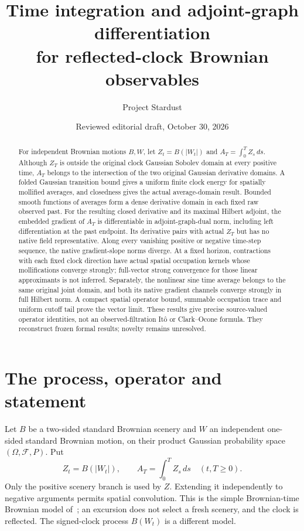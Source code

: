 \documentclass[11pt]{article}
\title{Time integration and adjoint-graph differentiation\\for reflected-clock Brownian observables}
\author{Project Stardust}
\date{Reviewed editorial draft, October 30, 2026}
\begin{document}
\maketitle
\begin{abstract}
For independent Brownian motions $B,W$, let $Z_t=B(|W_t|)$ and
$A_T=\int_0^T Z_s\,ds$. Although $Z_T$ is outside the original clock
Gaussian Sobolev domain at every positive time, $A_T$ belongs to the
intersection of the two original Gaussian derivative domains. A folded
Gaussian transition bound gives a uniform finite clock energy for spatially
mollified averages, and closedness gives the actual average-domain result.
Bounded smooth functions of averages form a dense derivative domain in
each fixed raw observed past. For the resulting closed derivative and its
maximal Hilbert adjoint, the embedded gradient of $A_T$ is differentiable
in adjoint-graph-dual norm, including left differentiation at the past
endpoint. Its derivative pairs with actual $Z_T$ but has no native field
representative. Along every vanishing positive or negative time-step
sequence, the native gradient-slope norms diverge. At a fixed horizon,
contractions with each fixed clock direction have actual spatial occupation
kernels whose mollifications converge strongly; full-vector strong convergence for those linear approximants is not inferred. Separately, the nonlinear sine time average belongs to the same original joint domain, and both its native gradient channels converge strongly in full Hilbert norm. A compact spatial operator bound, summable occupation trace and uniform cutoff tail prove the vector limit. These results give
precise source-valued operator identities, not an observed-filtration
It\^o or Clark--Ocone formula. They reconstruct frozen formal results;
novelty remains unresolved.
\end{abstract}

\section{The process, operator and statement}
Let $B$ be a two-sided standard Brownian scenery and $W$ an independent
one-sided standard Brownian motion, on their product Gaussian probability
space $(\Omega,\mathcal F,P)$. Put
\[
 Z_t=B(|W_t|),\qquad A_T=\int_0^T Z_s\,ds\quad(t,T\geq0).
\]
Only the positive scenery branch is used by $Z$. Extending it independently
to negative arguments permits spatial convolution. This is the simple
Brownian-time Brownian model of~\cite{AZ}; an excursion does not select a
fresh scenery, and the clock is reflected. The signed-clock process
$B(W_t)$ is a different model.
\end{document}
